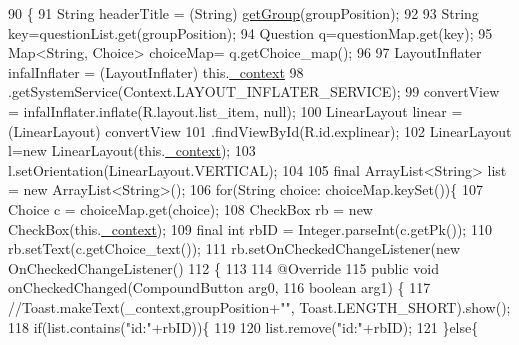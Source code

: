 \begin{DoxyCode}
90                                                                      \{
91         String headerTitle = (String) \hyperlink{classcom_1_1example_1_1qrpoll_1_1_expandable_list_adapter_a3f311ecc161915f1d8a864677d36b752}{getGroup}(groupPosition);
92      
93             String key=questionList.get(groupPosition);
94             Question q=questionMap.get(key);
95             Map<String, Choice> choiceMap= q.getChoice\_map();
96             
97             LayoutInflater infalInflater = (LayoutInflater) this.\hyperlink{classcom_1_1example_1_1qrpoll_1_1_expandable_list_adapter_a7a712744eebf94bc189b44e5d04ff7da}{\_context}
98                     .getSystemService(Context.LAYOUT\_INFLATER\_SERVICE);
99             convertView = infalInflater.inflate(R.layout.list\_item, null);
100             LinearLayout linear = (LinearLayout) convertView
101                     .findViewById(R.id.explinear);
102             LinearLayout l=\textcolor{keyword}{new} LinearLayout(this.\hyperlink{classcom_1_1example_1_1qrpoll_1_1_expandable_list_adapter_a7a712744eebf94bc189b44e5d04ff7da}{\_context});
103             l.setOrientation(LinearLayout.VERTICAL);
104             
105             \textcolor{keyword}{final} ArrayList<String> list = \textcolor{keyword}{new} ArrayList<String>();
106             \textcolor{keywordflow}{for}(String choice: choiceMap.keySet())\{
107                 Choice c = choiceMap.get(choice);
108                 CheckBox rb = \textcolor{keyword}{new} CheckBox(this.\hyperlink{classcom_1_1example_1_1qrpoll_1_1_expandable_list_adapter_a7a712744eebf94bc189b44e5d04ff7da}{\_context});
109                 \textcolor{keyword}{final} \textcolor{keywordtype}{int} rbID = Integer.parseInt(c.getPk());
110                 rb.setText(c.getChoice\_text());
111                 rb.setOnCheckedChangeListener(\textcolor{keyword}{new} OnCheckedChangeListener()
112                 \{
113 
114                     @Override
115                     \textcolor{keyword}{public} \textcolor{keywordtype}{void} onCheckedChanged(CompoundButton arg0,
116                             \textcolor{keywordtype}{boolean} arg1) \{
117                         \textcolor{comment}{//Toast.makeText(\_context,groupPosition+"", Toast.LENGTH\_SHORT).show();}
118                         \textcolor{keywordflow}{if}(list.contains(\textcolor{stringliteral}{"id:"}+rbID))\{
119                             
120                             list.remove(\textcolor{stringliteral}{"id:"}+rbID);
121                         \}\textcolor{keywordflow}{else}\{

\end{DoxyCode}
